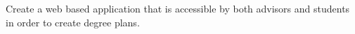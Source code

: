Create a web based application that is accessible by both advisors and students in order to create degree plans.